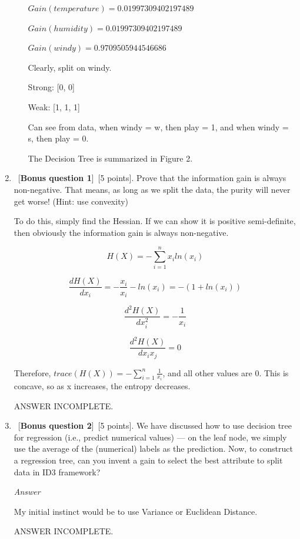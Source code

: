\documentclass[12pt, fullpage,letterpaper]{article}
\begin{document}
\begin{enumerate}
\begin{enumerate}
$Gain(temperature)=0.01997309402197489$

$Gain(humidity)=0.01997309402197489$

$Gain(windy)=0.9709505944546686$

\vspace{5mm}

Clearly, split on windy.

\vspace{5mm}

Strong: [0, 0]

Weak: [1, 1, 1]

\vspace{5mm}

Can see from data, when windy = w, then play = 1, and when windy = s, then play = 0.

\vspace{5mm}

The Decision Tree is summarized in Figure 2.

\end{enumerate}
\item ~[\textbf{Bonus question 1}]~[5 points].  Prove that the information gain is always non-negative.  That means, as long as we split the data, the purity will never get worse! (Hint: use convexity)

To do this, simply find the Hessian. If we can show it is positive semi-definite, then obviously the information gain is always non-negative.

\[
    H(X) = - \sum_{i=1}^n x_i ln(x_i)
\]

\[
    \frac{dH(X)}{dx_i} = -\frac{x_i}{x_i} - ln(x_i) = -(1 + ln(x_i))
\]

\[
    \frac{d^2H(X)}{dx_i^2} =  -\frac{1}{x_i}
\]

\[
    \frac{d^2H(X)}{dx_ix_j} =  0
\]

Therefore, $trace(H(X)) = -\sum_{i=1}^n \frac{1}{x_i}$, and all other values are 0. This is concave, so as x increases, the entropy decreases.

ANSWER INCOMPLETE.

\item ~[\textbf{Bonus question 2}]~[5 points].  We have discussed how to use decision tree for regression (i.e., predict numerical values) --- on the leaf node, we simply use the average of the (numerical) labels as the prediction.  Now, to construct a regression tree, can you invent a gain to select the best attribute to split data in ID3 framework?

\emph{Answer}

My initial instinct would be to use Variance or Euclidean Distance.

ANSWER INCOMPLETE.

\end{enumerate}
\end{document}

